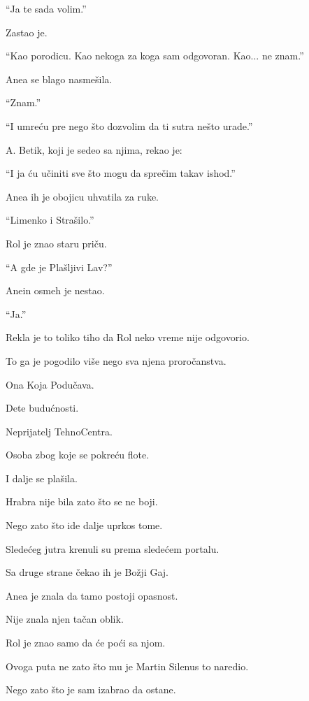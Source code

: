 ``Ja te sada volim.''

Zastao je.

``Kao porodicu. Kao nekoga za koga sam odgovoran. Kao... ne znam.''

Anea se blago nasmešila.

``Znam.''

``I umreću pre nego što dozvolim da ti sutra nešto urade.''

\bigskip

A. Betik, koji je sedeo sa njima, rekao je:

``I ja ću učiniti sve što mogu da sprečim takav ishod.''

Anea ih je obojicu uhvatila za ruke.

\bigskip

``Limenko i Strašilo.''

Rol je znao staru priču.

``A gde je Plašljivi Lav?''

Anein osmeh je nestao.

``Ja.''

\bigskip

Rekla je to toliko tiho da Rol neko vreme nije odgovorio.

\bigskip

To ga je pogodilo više nego sva njena proročanstva.

Ona Koja Podučava.

Dete budućnosti.

Neprijatelj TehnoCentra.

Osoba zbog koje se pokreću flote.

\bigskip

I dalje se plašila.

\bigskip

Hrabra nije bila zato što se ne boji.

Nego zato što ide dalje uprkos tome.

\bigskip

Sledećeg jutra krenuli su prema sledećem portalu.

Sa druge strane čekao ih je Božji Gaj.

Anea je znala da tamo postoji opasnost.

Nije znala njen tačan oblik.

Rol je znao samo da će poći sa njom.

Ovoga puta ne zato što mu je Martin Silenus to naredio.

Nego zato što je sam izabrao da ostane.